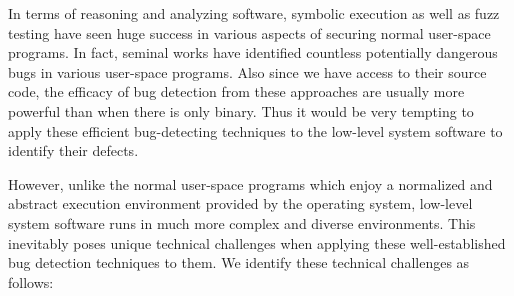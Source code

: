 In terms of reasoning and analyzing software, symbolic execution as well as fuzz testing have seen huge success in various aspects of securing normal user-space programs. In fact, seminal works  have identified countless potentially dangerous bugs in various user-space programs. Also since we have access to their source code, the efficacy of bug detection from these approaches are usually more powerful than when there is only binary. Thus it would be very tempting to apply these efficient bug-detecting techniques to the low-level system software to identify their defects.



However, unlike the normal user-space programs which enjoy a normalized and abstract execution environment provided by the operating system, low-level system software runs in much more complex and diverse environments. 
This inevitably poses unique technical challenges when applying these well-established bug detection techniques to them. 
We identify these technical challenges as follows: 

